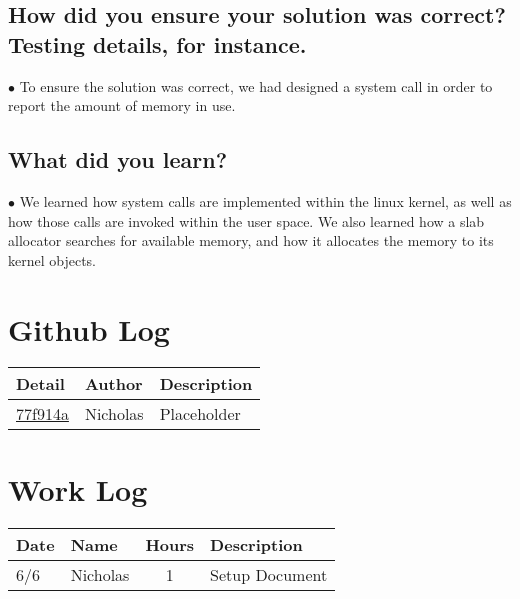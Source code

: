\documentclass[letterpaper,10pt,fleqn,draftclsnofoot,onecolumn]{IEEEtran}
\begin{document}
	\subsection{How did you ensure your solution was correct? Testing details, for instance.}
	$\bullet$ To ensure the solution was correct, we had designed a system call in order to report the amount of memory in use.
	
	\subsection{What did you learn?}
	$\bullet$ We learned how system calls are implemented within the linux kernel, as well as how those calls are invoked within the user space. We also learned how a slab allocator searches for available memory, and how it allocates the memory to its kernel objects.

	\section*{ Github Log }
	\begin{tabular}{l l p{1.5in}}\textbf{Detail} & \textbf{Author} & \textbf{Description}\\\hline
		\href{https://github.com/Skinnern/CS444/commit/77f914a6fe466b8115d31d7a97e08b2e86b00b7a}{77f914a} & Nicholas & Placeholder\\\hline

	\end{tabular}
	
	
	\section*{Work Log}
	\begin{tabular}{l l c p{1.1in}}\textbf{Date} & \textbf{Name} & \textbf{Hours} & \textbf{Description}\\\hline
		6/6 & Nicholas & 1 & Setup Document\\\hline

	\end{tabular}
		\nocite{*}
		
		
	
\end{document}
